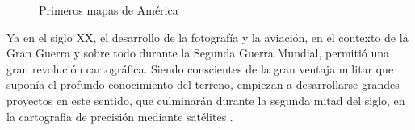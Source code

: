 \begin{figure}[h!btp]
	\begin{adjustbox}{minipage=\linewidth, fbox}
		\centering
		\hspace{10mm}
	\end{adjustbox}
	\caption{Primeros mapas de América}
	\label{fig:mapas-america}
\end{figure}

Ya en el siglo XX, el desarrollo de la fotografía y la aviación, en el contexto de la Gran Guerra y sobre todo durante la Segunda Guerra Mundial, permitió una gran revolución cartográfica. Siendo conscientes de la gran ventaja militar que suponía el profundo conocimiento del terreno, empiezan a desarrollarse grandes proyectos en este sentido, que culminarán durante la segunda mitad del siglo, en la cartografia de precisión mediante satélites \cite{Lind06}.

